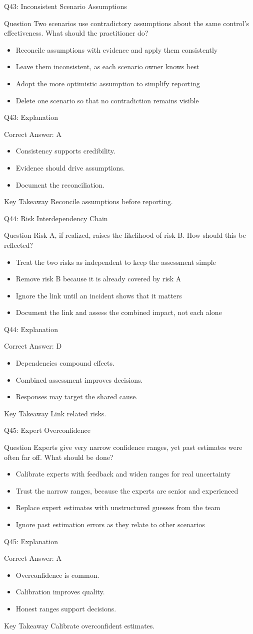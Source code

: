 \documentclass[aspectratio=169]{beamer}
\newcommand{\hq}[7]{%
	\begin{frame}{Q#1: #2}
		\begin{block}{Question}
			#3
		\end{block}
		\begin{itemize}
			#4
		\end{itemize}
	\end{frame}
	\begin{frame}{Q#1: Explanation}
		\begin{block}{Correct Answer: #5}
			\begin{itemize}
				#6
			\end{itemize}
		\end{block}
		\begin{alertblock}{Key Takeaway}
			#7
		\end{alertblock}
	\end{frame}
}
\begin{document}
	\hq{43}{Inconsistent Scenario Assumptions}
	{Two scenarios use contradictory assumptions about the same control's effectiveness. What should the practitioner do?}
	{\item[\textbf{(A)}] Reconcile assumptions with evidence and apply them consistently
		\item[\textbf{(B)}] Leave them inconsistent, as each scenario owner knows best
		\item[\textbf{(C)}] Adopt the more optimistic assumption to simplify reporting
		\item[\textbf{(D)}] Delete one scenario so that no contradiction remains visible}
	{A}
	{\item Consistency supports credibility.
		\item Evidence should drive assumptions.
		\item Document the reconciliation.}
	{Reconcile assumptions before reporting.}

	\hq{44}{Risk Interdependency Chain}
	{Risk A, if realized, raises the likelihood of risk B. How should this be reflected?}
	{\item[\textbf{(A)}] Treat the two risks as independent to keep the assessment simple
		\item[\textbf{(B)}] Remove risk B because it is already covered by risk A
		\item[\textbf{(C)}] Ignore the link until an incident shows that it matters
		\item[\textbf{(D)}] Document the link and assess the combined impact, not each alone}
	{D}
	{\item Dependencies compound effects.
		\item Combined assessment improves decisions.
		\item Responses may target the shared cause.}
	{Link related risks.}

	\hq{45}{Expert Overconfidence}
	{Experts give very narrow confidence ranges, yet past estimates were often far off. What should be done?}
	{\item[\textbf{(A)}] Calibrate experts with feedback and widen ranges for real uncertainty
		\item[\textbf{(B)}] Trust the narrow ranges, because the experts are senior and experienced
		\item[\textbf{(C)}] Replace expert estimates with unstructured guesses from the team
		\item[\textbf{(D)}] Ignore past estimation errors as they relate to other scenarios}
	{A}
	{\item Overconfidence is common.
		\item Calibration improves quality.
		\item Honest ranges support decisions.}
	{Calibrate overconfident estimates.}
\end{document}
